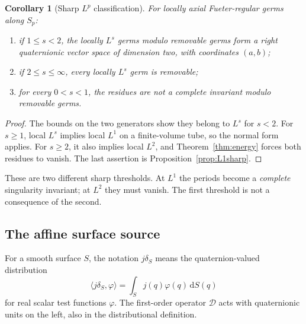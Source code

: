 \documentclass[11pt,a4paper]{article}
\numberwithin{equation}{section}
\newtheorem{corollary}[theorem]{Corollary}
\theoremstyle{definition}
\theoremstyle{remark}
\newcommand{\D}{\mathcal D}
\newcommand{\dd}{\,\mathrm d}
\begin{document}
\begin{corollary}[Sharp $L^p$ classification]\label{cor:Lp}
For locally axial Fueter-regular germs along $S_p$:
\begin{enumerate}[label=\textup{(\roman*)}]
\item if $1\le s<2$, the locally $L^s$ germs modulo removable germs form a
right quaternionic vector space of dimension two, with coordinates $(a,b)$;
\item if $2\le s\le\infty$, every locally $L^s$ germ is removable;
\item for every $0<s<1$, the residues are not a complete invariant modulo
removable germs.
\end{enumerate}
\end{corollary}
\begin{proof}
The bounds on the two generators show they belong to $L^s$ for $s<2$.
For $s\ge1$, local $L^s$ implies local $L^1$ on a finite-volume tube, so the
normal form applies. For $s\ge2$, it also implies local $L^2$, and
Theorem~\ref{thm:energy} forces both residues to vanish. The last assertion
is Proposition~\ref{prop:L1sharp}.
\end{proof}

These are two different sharp thresholds. At $L^1$ the periods become a
\emph{complete} singularity invariant; at $L^2$ they must vanish. The first
threshold is not a consequence of the second.

\subsection{The affine surface source}
For a smooth surface $S$, the notation $j\delta_S$ means the
quaternion-valued distribution
\[
 \langle j\delta_S,\varphi\rangle=\int_S j(q)\varphi(q)\dd S(q)
\]
for real scalar test functions $\varphi$. The first-order operator $\D$ acts
with quaternionic units on the left, also in the distributional definition.
\end{document}
